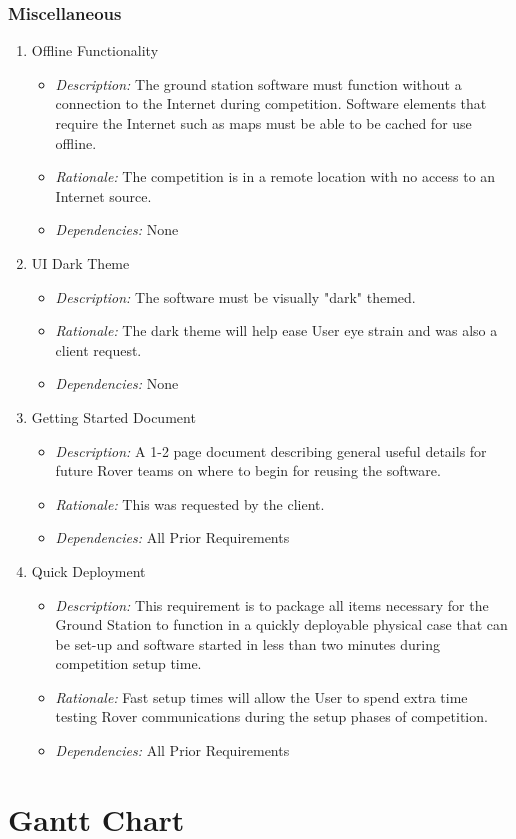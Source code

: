 \documentclass[onecolumn, draftclsnofoot, 10pt, compsoc]{IEEEtran}
\newcommand{\functRequ}[4]{
\item #1%
\par
\begin{itemize}
\item \textit{Description:} #2.%
\item \textit{Rationale:} #3.%
\item \textit{Dependencies:} #4%
\end{itemize}
}
\begin{document}
\subsubsection{Miscellaneous}
\begin{enumerate}
\functRequ{Offline Functionality}
{The ground station software must function without a connection to the Internet during competition.
Software elements that require the Internet such as maps must be able to be cached for use offline}
{The competition is in a remote location with no access to an Internet source}
{None}

\functRequ{UI Dark Theme}
{The software must be visually "dark" themed}
{The dark theme will help ease User eye strain and was also a client request}
{None}

\functRequ{Getting Started Document}
{A 1-2 page document describing general useful details for future Rover teams on where to begin for reusing the software}
{This was requested by the client}
{All Prior Requirements}

\functRequ{Quick Deployment}
{This requirement is to package all items necessary for the Ground Station to function in a quickly deployable physical case that can be set-up and software started in less than two minutes during competition setup time}
{Fast setup times will allow the User to spend extra time testing Rover communications during the setup phases of competition}
{All Prior Requirements}
\end{enumerate}


\section{Gantt Chart}

\end{document}
